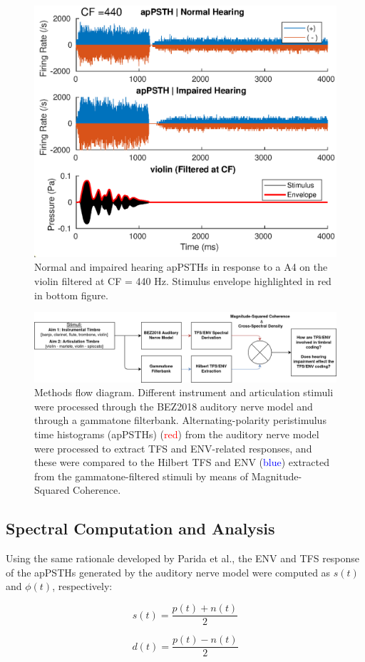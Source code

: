 \documentclass[conference]{IEEEtran}
\begin{document}
\begin{figure}
\includegraphics[width = .5\textwidth]{apPSTH_violin}
\caption{Normal and impaired hearing apPSTHs in response to a A4 on the violin filtered at CF = 440 Hz. Stimulus envelope highlighted in red in bottom figure.}
\label{fig:apPSTH}
\end{figure} 

\begin{figure}
\includegraphics[width = \textwidth]{methods_flow_sanspic}
\caption{Methods flow diagram. Different instrument and articulation stimuli were processed through the BEZ2018 auditory nerve model  and through a gammatone filterbank. Alternating-polarity peristimulus time histograms (apPSTHs) (\textcolor{red}{red}) from the auditory nerve model were processed to extract TFS and ENV-related responses, and these were compared to the Hilbert TFS and ENV (\textcolor{blue}{blue}) extracted from the gammatone-filtered stimuli by means of Magnitude-Squared Coherence.}
\label{fig:flow}
\end{figure}
\subsection{Spectral Computation and Analysis}
Using the same rationale developed by Parida et al., the ENV and TFS  response of the apPSTHs generated by the auditory nerve model were computed as $s(t)$ and $\phi(t)$, respectively:

\begin{equation}
s(t) = \frac{p(t)+n(t)}{2}
\end{equation}

\begin{equation}
d(t) = \frac{p(t)-n(t)}{2}
\end{equation}
\end{document}
